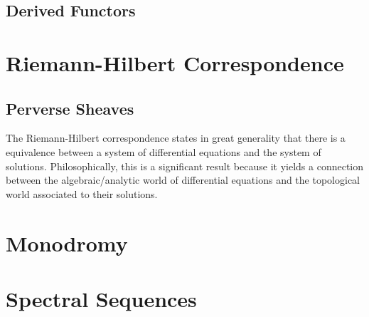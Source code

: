 \subsection{Derived Functors}
\section{Riemann-Hilbert Correspondence}

\subsection{Perverse Sheaves}
The Riemann-Hilbert correspondence states in great generality that there is a equivalence between a system of differential equations and the system of solutions.
Philosophically, this is a significant result because it yields a connection between the algebraic/analytic world of differential equations and the topological world associated to their solutions.
\section{Monodromy}
\section{Spectral Sequences}
